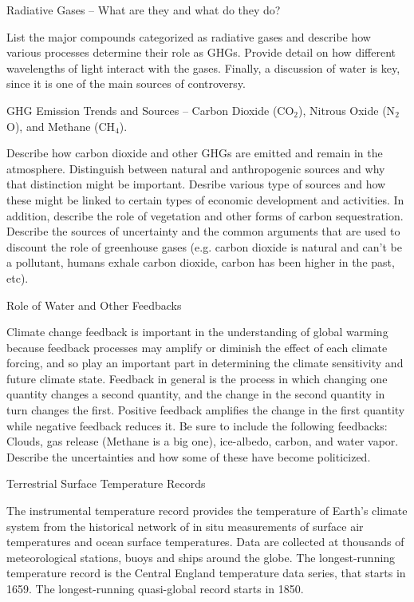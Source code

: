 \documentclass{article}\usepackage[]{graphicx}\usepackage[]{color}
\newenvironment{enumerate*}%
  {\begin{enumerate}%
    \setlength{\itemsep}{0pt}%
    \setlength{\parskip}{0pt}}%
  {\end{enumerate}}
\begin{document}
\begin{enumerate*}
  \item Radiative Gases -- What are they and what do they do?
  
List the major compounds categorized as radiative gases and describe how various processes determine their role as GHGs. Provide detail on how different wavelengths of light interact with the gases. Finally, a discussion of water is key, since it is one of the main sources of controversy. 
  
  \item GHG Emission Trends and Sources -- Carbon Dioxide (CO$_2$), Nitrous Oxide (N$_2$O), and Methane (CH$_4$).

Describe how carbon dioxide and other GHGs are emitted and remain in the atmosphere. Distinguish between natural and anthropogenic sources and why that distinction might be important. Desribe various type of sources and how these might be linked to certain types of economic development and activities. In addition, describe the role of vegetation and other forms of carbon sequestration. Describe the sources of uncertainty and the common arguments that are used to discount the role of greenhouse gases (e.g. carbon dioxide is natural and can't be a pollutant, humans exhale carbon dioxide, carbon has been higher in the past, etc). 

  \item Role of Water and Other Feedbacks
  
Climate change feedback is important in the understanding of global warming because feedback processes may amplify or diminish the effect of each climate forcing, and so play an important part in determining the climate sensitivity and future climate state. Feedback in general is the process in which changing one quantity changes a second quantity, and the change in the second quantity in turn changes the first. Positive feedback amplifies the change in the first quantity while negative feedback reduces it. Be sure to include the following feedbacks: Clouds, gas release (Methane is a big one), ice-albedo, carbon, and water vapor. Describe the uncertainties and how some of these have become politicized.

  \item Terrestrial Surface Temperature Records
  
The instrumental temperature record provides the temperature of Earth's climate system from the historical network of in situ measurements of surface air temperatures and ocean surface temperatures. Data are collected at thousands of meteorological stations, buoys and ships around the globe. The longest-running temperature record is the Central England temperature data series, that starts in 1659. The longest-running quasi-global record starts in 1850. 
  

\end{enumerate*}
\end{document}
